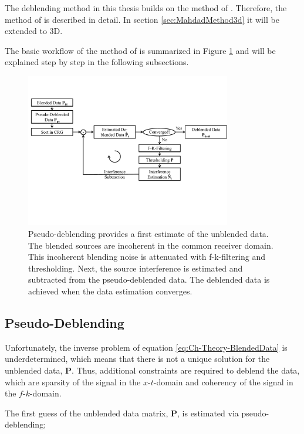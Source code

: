 The deblending method in this thesis builds on the method of \citet{Mahdad-Deblending-Method}. Therefore, the method of \citet{Mahdad-Deblending-Method} is described in detail. In section \ref{sec:MahdadMethod3d} it will be extended to 3D.


The basic workflow of the method of \citet{Mahdad-Deblending-Method} is summarized in Figure \ref{fig:Ch-Theory-FlowChart} and will be explained step by step in the following subsections. 

\begin{figure}
	\centering
	\includegraphics[width=0.8\textwidth]{Plots/Mahdad-FlowChart-v3}
	\caption{Pseudo-deblending provides a first estimate of the unblended data. The blended sources are incoherent in the common receiver domain. This incoherent blending noise is attenuated with f-k-filtering and thresholding. Next, the source interference is estimated and subtracted from the pseudo-deblended data. The deblended data is achieved when the data estimation converges.}
	\label{fig:Ch-Theory-FlowChart}
\end{figure}

\subsection{Pseudo-Deblending}

Unfortunately, the inverse problem of equation \ref{eq:Ch-Theory-BlendedData} is underdetermined, which means that there is not a unique solution for the unblended data, $\mathbf{P}$. Thus, additional constraints are required to deblend the data, which are sparsity of the signal in the $x$-$t$-domain and coherency of the signal in the $f$-$k$-domain. 

The first guess of the unblended data matrix, $\mathbf{P}$, is estimated via pseudo-deblending;

